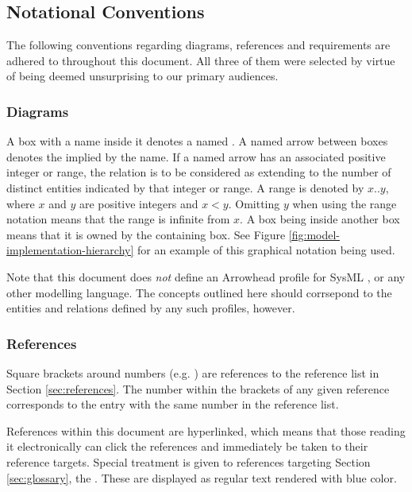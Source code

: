 \subsection{Notational Conventions}
\label{sec:introduction:conventions}

The following conventions regarding diagrams, references and requirements are adhered to throughout this document.
All three of them were selected by virtue of being deemed unsurprising to our primary audiences.

\subsubsection{Diagrams}

A box with a name inside it denotes a named .
A named arrow between boxes denotes the  implied by the name.
If a named arrow has an associated positive integer or range, the relation is to be considered as extending to the number of distinct entities indicated by that integer or range.
A range is denoted by $x..y$, where $x$ and $y$ are positive integers and $x<y$.
Omitting $y$ when using the range notation means that the range is infinite from $x$.
A box being inside another box means that it is owned by the containing box.
See Figure \ref{fig:model-implementation-hierarchy} for an example of this graphical notation being used.

Note that this document does \textit{not} define an Arrowhead profile for SysML \cite{omg2019sysml}, or any other modelling language.
The concepts outlined here should corrsepond to the entities and relations defined by any such profiles, however.

\subsubsection{References}

Square brackets around numbers (e.g. \cite{delsing2017iot}) are references to the reference list in Section \ref{sec:references}.
The number within the brackets of any given reference corresponds to the entry with the same number in the reference list.

References within this document are hyperlinked, which means that those reading it electronically can click the references and immediately be taken to their reference targets.
Special treatment is given to references targeting Section \ref{sec:glossary}, the .
These are displayed as regular text rendered with blue color.

